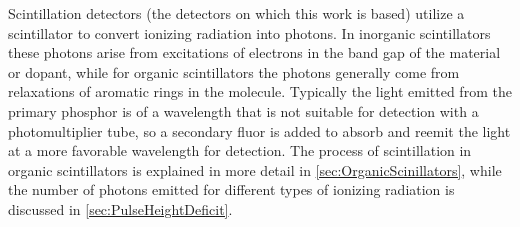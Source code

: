 
Scintillation detectors (the detectors on which this work is based) utilize a scintillator to convert ionizing radiation into photons.
In inorganic scintillators these photons arise from excitations of electrons in the band gap of the material or dopant, while for organic scintillators the photons generally come from relaxations of aromatic rings in the molecule.
Typically the light emitted from the primary phosphor is of a wavelength that is not suitable for detection with a photomultiplier tube, so a secondary fluor is added to absorb and reemit the light at a more favorable wavelength for detection.
The process of scintillation in organic scintillators is explained in more detail in \autoref{sec:OrganicScinillators}, while the number of photons emitted for different types of ionizing radiation is discussed in \autoref{sec:PulseHeightDeficit}.

